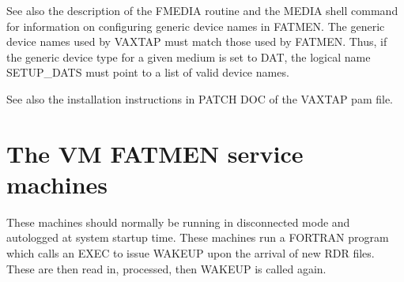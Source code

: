 \par
See also the description of the FMEDIA routine and the MEDIA shell
command for information on configuring generic device names in
FATMEN. The generic device names used by VAXTAP must match those
used by FATMEN. Thus, if the generic device type for a given
medium is set to DAT, the logical name SETUP\_DATS must point
to a list of valid device names.
\par
See also the installation instructions in PATCH DOC of the VAXTAP
pam file.
\chapter{The VM FATMEN service machines}
\par
These machines should normally be running
in disconnected mode and autologged
at system startup time. These machines run a FORTRAN program which
calls an EXEC to issue WAKEUP upon the arrival of new RDR files.
These are then read in, processed, then WAKEUP is called again.
